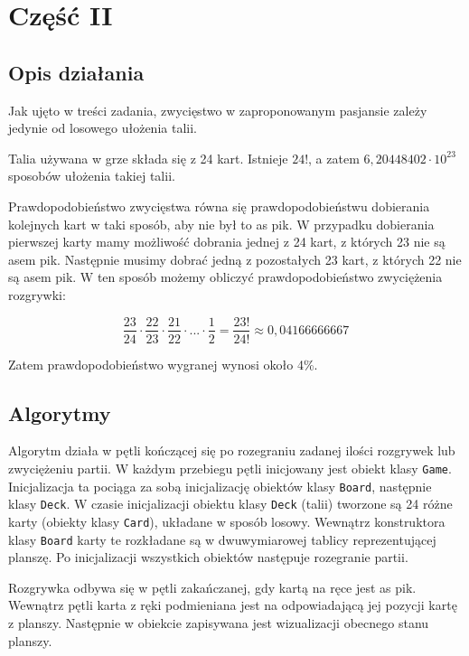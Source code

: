 \documentclass[12pt,a4paper]{article}
\begin{document}
\newpage

\section*{Część II}
\subsection*{Opis działania} 
Jak ujęto w treści zadania, zwycięstwo w zaproponowanym pasjansie zależy jedynie od losowego ułożenia talii. 

Talia używana w grze składa się z 24 kart. Istnieje $24!$, a zatem $6,20448402 \cdot 10^{23}$ sposobów ułożenia takiej talii.

Prawdopodobieństwo zwycięstwa równa się prawdopodobieństwu dobierania kolejnych kart w taki sposób, aby nie był to as pik. W przypadku dobierania pierwszej karty mamy możliwość dobrania jednej z 24 kart, z których 23 nie są asem pik. Następnie musimy dobrać jedną z pozostałych 23 kart, z których 22 nie są asem pik. W ten sposób możemy obliczyć prawdopodobieństwo zwyciężenia rozgrywki:

\begin{equation}
    \frac{23}{24} \cdot \frac{22}{23} \cdot \frac{21}{22} \cdot ... \cdot \frac{1}{2} = \frac{23!}{24!} \approx  0,04166666667
\end{equation}

Zatem prawdopodobieństwo wygranej wynosi około 4\%.
	
\subsection*{Algorytmy}
Algorytm działa w pętli kończącej się po rozegraniu zadanej ilości rozgrywek lub zwyciężeniu partii. W każdym przebiegu pętli inicjowany jest obiekt klasy \texttt{Game}. Inicjalizacja ta pociąga za sobą inicjalizację obiektów klasy \texttt{Board}, następnie klasy \texttt{Deck}. W czasie inicjalizacji obiektu klasy \texttt{Deck} (talii) tworzone są 24 różne karty (obiekty klasy \texttt{Card}), układane w sposób losowy. Wewnątrz konstruktora klasy \texttt{Board} karty te rozkładane są w dwuwymiarowej tablicy reprezentującej planszę. Po inicjalizacji wszystkich obiektów następuje rozegranie partii. 

Rozgrywka odbywa się w pętli zakańczanej, gdy kartą na ręce jest as pik. Wewnątrz pętli karta z ręki podmieniana jest na odpowiadającą jej pozycji kartę z planszy. Następnie w obiekcie zapisywana jest wizualizacji obecnego stanu planszy.
\end{document}
